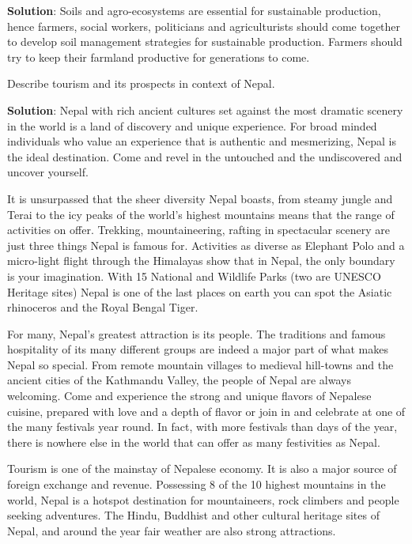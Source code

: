 \documentclass[
  openany]{book}
\newcommand{\question}{\item}
\newenvironment{solution}{ {\bfseries Solution}:}{}
\begin{document}
\begin{questions}
\begin{solution}
Soils and agro-ecosystems are essential for sustainable production, hence farmers, social workers, politicians and agriculturists should come together to develop soil management strategies for sustainable production. Farmers should try to keep their farmland productive for generations to come.
\end{solution}

\question Describe tourism and its prospects in context of Nepal.

\begin{solution}
Nepal with rich ancient cultures set against the most dramatic scenery in the world is a land of discovery and unique experience. For broad minded individuals who value an experience that is authentic and mesmerizing, Nepal is the ideal destination. Come and revel in the untouched and the undiscovered and uncover yourself.

It is unsurpassed that the sheer diversity Nepal boasts, from steamy jungle and Terai to the icy peaks of the world’s highest mountains means that the range of activities on offer. Trekking, mountaineering, rafting in spectacular scenery are just three things Nepal is famous for. Activities as diverse as Elephant Polo and a micro-light flight through the Himalayas show that in Nepal, the only boundary is your imagination. With 15 National and Wildlife Parks (two are UNESCO Heritage sites) Nepal is one of the last places on earth you can spot the Asiatic rhinoceros and the Royal Bengal Tiger.

For many, Nepal’s greatest attraction is its people. The traditions and famous hospitality of its many different groups are indeed a major part of what makes Nepal so special. From remote mountain villages to medieval hill-towns and the ancient cities of the Kathmandu Valley, the people of Nepal are always welcoming. Come and experience the strong and unique flavors of Nepalese cuisine, prepared with love and a depth of flavor or join in and celebrate at one of the many festivals year round. In fact, with more festivals than days of the year, there is nowhere else in the world that can offer as many festivities as Nepal.

Tourism is one of the mainstay of Nepalese economy. It is also a major source of foreign exchange and revenue. Possessing 8 of the 10 highest mountains in the world, Nepal is a hotspot destination for mountaineers, rock climbers and people seeking adventures. The Hindu, Buddhist and other cultural heritage sites of Nepal, and around the year fair weather are also strong attractions.


\end{solution}
\end{questions}
\end{document}
